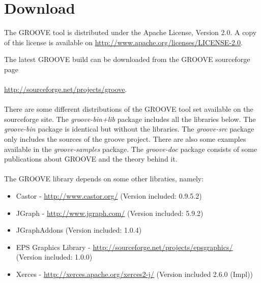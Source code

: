 \section{Download}

The GROOVE tool is distributed under the Apache License, Version 2.0. A copy of this license is available on 
\url{http://www.apache.org/licenses/LICENSE-2.0}.

\bigskip

The latest GROOVE build can be downloaded from the GROOVE sourceforge page\\
\\
\url{http://sourceforge.net/projects/groove}.\\
\\
There are some different distributions of the GROOVE tool set available on the sourceforge site. The \emph{groove-bin+lib} package includes all the libraries below. The \emph{groove-bin} package is identical but without the libraries. The \emph{groove-src} package only includes the sources of the groove project. There are also some examples available in the \emph{groove-samples} package. The \emph{groove-doc} package consists of some publications about GROOVE and the theory behind it. 
\\\\
The GROOVE library depends on some other libraties, namely:

\begin{itemize}
\item Castor - \url{http://www.castor.org/} (Version included: 0.9.5.2)
\item JGraph - \url{http://www.jgraph.com/} (Version included: 5.9.2)
\item JGraphAddons (Version included: 1.0.4)
\item EPS Graphics Library - \url{http://sourceforge.net/projects/epsgraphics/} (Version included: 1.0.0)
\item Xerces - \url{http://xerces.apache.org/xerces2-j/} (Version included 2.6.0 (Impl))
\end{itemize}




